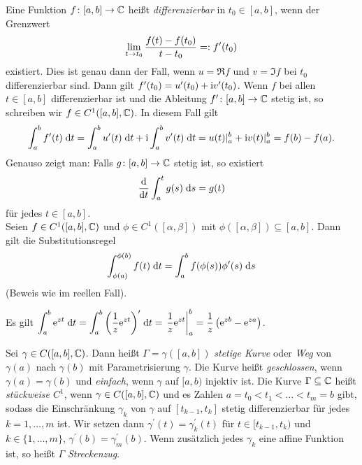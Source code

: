 \documentclass[a4paper,twoside,DIV15,BCOR12mm]{scrbook}
\begin{document}
\noindent Eine Funktion $f\colon[a,b]\to\mathbb{C}$ heißt \emph{differenzierbar} in $t_0\in[a,b]$, wenn der Grenzwert \[\lim_{t\to t_0}{\frac{f(t)-f(t_0)}{t-t_0}} =: f^\prime(t_0)\] existiert. Dies ist genau dann der Fall, wenn $u=\Re{f}$ und $v=\Im{f}$ bei $t_0$ differenzierbar sind. Dann gilt $f^\prime(t_0) = u^\prime(t_0) + \mathrm{i} v^\prime(t_0)$. Wenn $f$ bei allen $t\in[a,b]$ differenzierbar ist und die Ableitung $f^\prime\colon[a,b]\to\mathbb{C}$ stetig ist, so schreiben wir $f\in C^1([a,b],\mathbb{C})$. In diesem Fall gilt
\begin{equation}\label{2.1}
\int_{a}^{b}{f^\prime(t)}\;\mathrm{d} t = \int_{a}^{b}{u^\prime(t)}\;\mathrm{d} t + \mathrm{i}\int_{a}^{b}{v^\prime(t)}\;\mathrm{d} t = u(t)\vert_a^b + \mathrm{i} v(t)\vert_a^b = f(b) - f(a).
\end{equation}
Genauso zeigt man: Falls $g\colon[a,b]\to\mathbb{C}$ stetig ist, so existiert
\begin{equation}\label{2.2}
\frac{\mathrm{d}}{\mathrm{d}t} \int_{a}^{t}{g(s)}\;\mathrm{d} s = g(t)
\end{equation}
für jedes $t\in[a,b]$.\\
Seien $f\in C^1([a,b],\mathbb{C})$ und $\phi\in C^1([\alpha,\beta])$ mit $\phi([\alpha,\beta])\subseteq[a,b]$. Dann gilt die Substitutionsregel
\[\int_{\phi(a)}^{\phi(b)}{f(t)}\;\mathrm{d} t = \int_{a}^{b}{f(\phi(s))\phi^\prime(s)}\;\mathrm{d} s\]
(Beweis wie im reellen Fall).

\begin{bsp} \label{bsp2.1}
Es gilt $\displaystyle\int_{a}^{b}{\mathrm{e}^{zt}}\;\mathrm{d} t = \int_{a}^{b}{\left(\frac1z \mathrm{e}^{zt}\right)^\prime}\;\mathrm{d} t = \left.\frac1z \mathrm{e}^{zt} \right\vert_a^b = \frac1z\left(\mathrm{e}^{zb}-\mathrm{e}^{za}\right)$.
\end{bsp}

\begin{dfn} \label{dfn2.2}
Sei $\gamma\in C([a,b],\mathbb{C})$. Dann heißt $\Gamma=\gamma([a,b])$ \emph{stetige Kurve} oder \emph{Weg} von $\gamma(a)$ nach $\gamma(b)$ mit Parametrisierung $\gamma$. Die Kurve heißt \emph{geschlossen}, wenn $\gamma(a)=\gamma(b)$ und \emph{einfach}, wenn $\gamma$ auf $[a,b)$ injektiv ist. Die Kurve $\Gamma\subseteq\mathbb{C}$ heißt \emph{stückweise $C^1$}, wenn $\gamma\in C([a,b],\mathbb{C})$ und es Zahlen $a=t_0<t_1<\dotso<t_m=b$ gibt, sodass die Einschränkung $\gamma_k$ von $\gamma$ auf $[t_{k-1},t_k]$ stetig differenzierbar für jedes $k=1,\dotsc,m$ ist. Wir setzen dann $\gamma^\prime(t)=\gamma_k^\prime(t)$ für $t\in[t_{k-1},t_k)$ und $k\in\{1,\dotsc,m\}$, $\gamma^\prime(b)=\gamma_m^\prime(b)$. Wenn zusätzlich jedes $\gamma_k$ eine affine Funktion ist, so heißt $\Gamma$ \emph{Streckenzug}.
\end{dfn}
\end{document}
